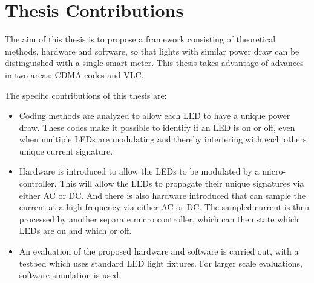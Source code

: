 

\section{Thesis Contributions}

The aim of this thesis is to propose a framework consisting of theoretical methods, hardware and software, so that lights with similar power draw can be distinguished with a single smart-meter.
This thesis takes advantage of advances in two areas: CDMA codes and VLC.

The specific contributions of this thesis are:

\begin{itemize}

	\item Coding methods are analyzed to allow each LED to have a unique power draw. 
	These codes make it possible to identify if an LED is on or off, even when multiple LEDs are modulating and thereby interfering with each others unique current signature.




	\item Hardware is introduced to allow the LEDs to be modulated by a micro-controller. 
	This will allow the LEDs to propagate their unique signatures via either AC or DC. 
	And there is also hardware introduced that can sample the current at a high frequency via either AC or DC.
	The sampled current is then processed by another separate micro controller, which can then state which LEDs are on and which or off.




	\item An evaluation of the proposed hardware and software is carried out, with a testbed which uses standard LED light fixtures. For larger scale evaluations, software simulation is used. 
\end{itemize}
